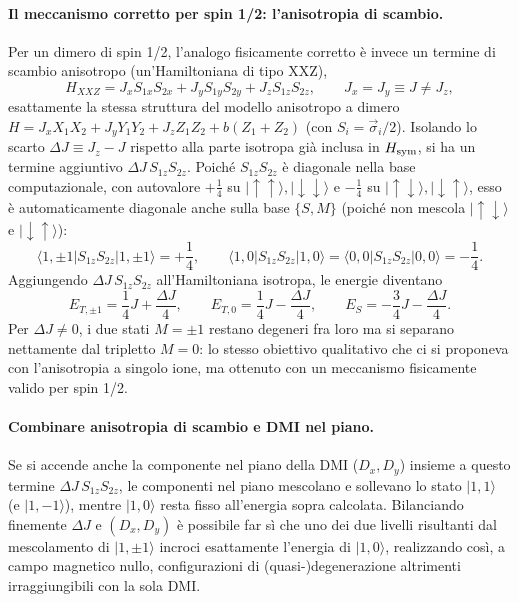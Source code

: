 \documentclass[11pt,a4paper]{article}
\begin{document}
\paragraph{Il meccanismo corretto per spin 1/2: l'anisotropia di scambio.} Per un
dimero di spin 1/2, l'analogo fisicamente corretto \`e invece un termine di scambio
anisotropo (un'Hamiltoniana di tipo XXZ),
$$H_{XXZ} = J_x S_{1x}S_{2x} + J_y S_{1y}S_{2y} + J_z S_{1z}S_{2z}, \qquad J_x=J_y\equiv J\neq J_z,$$
esattamente la stessa struttura del modello anisotropo a dimero $H=J_x X_1X_2+J_y
Y_1Y_2+J_z Z_1Z_2+b(Z_1+Z_2)$ (con $S_i=\vec\sigma_i/2$). Isolando lo scarto
$\Delta J\equiv J_z-J$ rispetto alla parte isotropa gi\`a inclusa in $H_{\rm sym}$, si
ha un termine aggiuntivo $\Delta J\,S_{1z}S_{2z}$. Poich\'e $S_{1z}S_{2z}$ \`e
diagonale nella base computazionale, con autovalore $+\tfrac14$ su
$|\!\uparrow\uparrow\rangle,|\!\downarrow\downarrow\rangle$ e $-\tfrac14$ su
$|\!\uparrow\downarrow\rangle,|\!\downarrow\uparrow\rangle$, esso \`e automaticamente
diagonale anche sulla base $\{S,M\}$ (poich\'e non mescola $|\!\uparrow\downarrow\rangle$
e $|\!\downarrow\uparrow\rangle$):
$$\langle1,\pm1|S_{1z}S_{2z}|1,\pm1\rangle = +\frac14, \qquad \langle1,0|S_{1z}S_{2z}|1,0\rangle=\langle0,0|S_{1z}S_{2z}|0,0\rangle=-\frac14.$$
Aggiungendo $\Delta J\,S_{1z}S_{2z}$ all'Hamiltoniana isotropa, le energie diventano
$$E_{T,\pm1}=\frac14 J+\frac{\Delta J}{4}, \qquad E_{T,0}=\frac14 J-\frac{\Delta J}{4}, \qquad E_S=-\frac34 J-\frac{\Delta J}{4}.$$
Per $\Delta J\neq0$, i due stati $M=\pm1$ restano degeneri fra loro ma si separano
nettamente dal tripletto $M=0$: lo stesso obiettivo qualitativo che ci si proponeva con
l'anisotropia a singolo ione, ma ottenuto con un meccanismo fisicamente valido per spin
1/2.

\paragraph{Combinare anisotropia di scambio e DMI nel piano.} Se si accende anche la
componente nel piano della DMI ($D_x,D_y$) insieme a questo termine $\Delta
J\,S_{1z}S_{2z}$, le componenti nel piano mescolano e sollevano lo stato $|1,1\rangle$
(e $|1,-1\rangle$), mentre $|1,0\rangle$ resta fisso all'energia sopra calcolata.
Bilanciando finemente $\Delta J$ e $(D_x,D_y)$ \`e possibile far s\`i che uno dei due
livelli risultanti dal mescolamento di $|1,\pm1\rangle$ incroci esattamente l'energia
di $|1,0\rangle$, realizzando cos\`i, a campo magnetico nullo, configurazioni di
(quasi-)degenerazione altrimenti irraggiungibili con la sola DMI.
\end{document}
